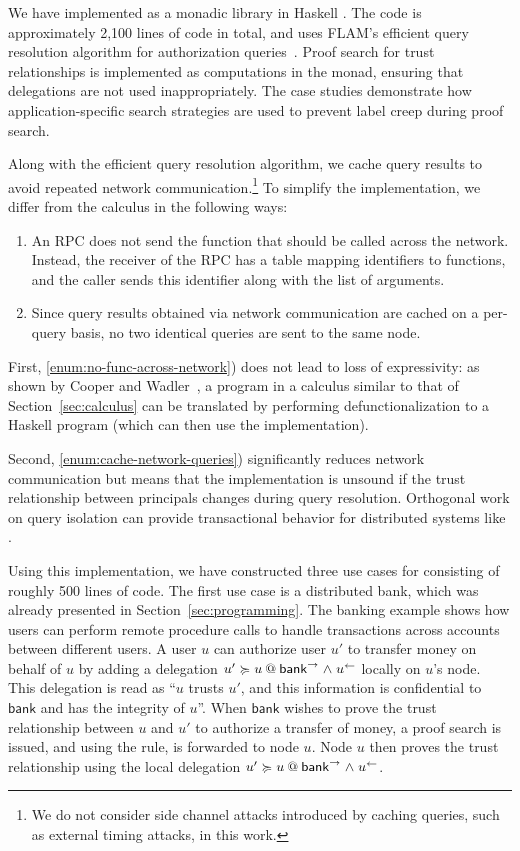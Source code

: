 We have implemented \lang{} as a monadic library in Haskell \cite{flamiolib}. The code is approximately 2,100 lines of code in total, and uses FLAM's efficient query resolution algorithm for authorization queries~\cite{Arden:2015:FA:2859845.2859998}. Proof search for trust relationships is implemented as computations in the \lang{} monad, ensuring that delegations are not used inappropriately. The case studies demonstrate how application-specific search strategies are used to prevent label creep during proof search.

Along with the efficient query resolution algorithm, we cache query results to avoid repeated network communication.\footnote{We do not consider side channel attacks introduced by caching queries, such as external timing attacks, in this work.}
To simplify the implementation, we differ from the calculus in the following ways:
\begin{enumerate}
    \item \label{enum:no-func-across-network} An RPC does not send the function that should be called across the network. Instead, the receiver of the RPC has a table mapping identifiers to functions, and the caller sends this identifier along with the list of arguments.
    \item \label{enum:cache-network-queries} Since query results obtained via network communication are cached on a per-query basis, no two identical queries are sent to the same node.
\end{enumerate}

First, \ref{enum:no-func-across-network}) does not lead to loss of expressivity: as shown by Cooper and Wadler~\cite{Cooper:2009:RC:1599410.1599439},  a program in a calculus similar to that of Section~\ref{sec:calculus} can be translated by performing defunctionalization to a Haskell program (which can then use the \lang{} implementation). 

Second, \ref{enum:cache-network-queries}) significantly reduces network communication but means that the implementation is unsound if the trust relationship between principals changes during query resolution. Orthogonal work on query isolation \cite{Liu:2009:FPS:1629575.1629606} can provide transactional behavior for distributed systems like \lang.

Using this implementation, we have constructed three use cases for \lang{} consisting of roughly 500 lines of code. The first use case is a distributed bank, which was already presented in Section~\ref{sec:programming}. The banking example shows how users can perform remote procedure calls to handle transactions across accounts between different users. A user $u$ can authorize user $u'$ to transfer money on behalf of $u$ by adding a delegation $\lb{\conf{\mathsf{bank}} \conj \integ{u}}{u' \actsfor u}$ locally on $u$'s node. This delegation is read as ``$u$ trusts $u'$, and this information is confidential to $\mathsf{bank}$ and has the integrity of $u$''. When $\mathsf{bank}$ wishes to prove the trust relationship between $u$ and $u'$ to authorize a transfer of money, a proof search is issued, and using the  rule, is forwarded to node $u$. Node $u$ then proves the trust relationship using the local delegation $\lb{\conf{\mathsf{bank}} \conj \integ{u}}{u' \actsfor u}$.

